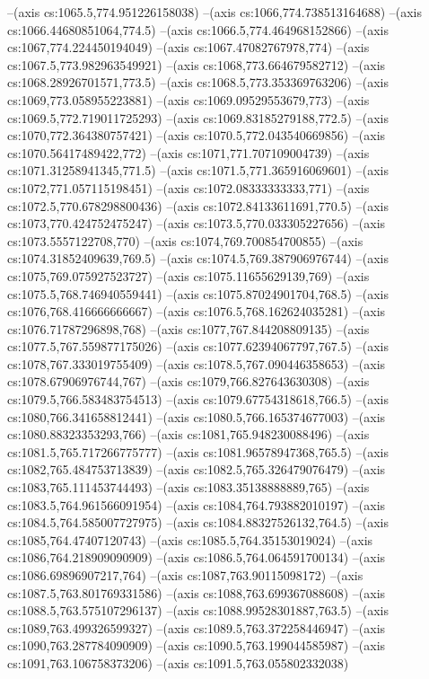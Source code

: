 --(axis cs:1065.5,774.951226158038)
--(axis cs:1066,774.738513164688)
--(axis cs:1066.44680851064,774.5)
--(axis cs:1066.5,774.464968152866)
--(axis cs:1067,774.224450194049)
--(axis cs:1067.47082767978,774)
--(axis cs:1067.5,773.982963549921)
--(axis cs:1068,773.664679582712)
--(axis cs:1068.28926701571,773.5)
--(axis cs:1068.5,773.353369763206)
--(axis cs:1069,773.058955223881)
--(axis cs:1069.09529553679,773)
--(axis cs:1069.5,772.719011725293)
--(axis cs:1069.83185279188,772.5)
--(axis cs:1070,772.364380757421)
--(axis cs:1070.5,772.043540669856)
--(axis cs:1070.56417489422,772)
--(axis cs:1071,771.707109004739)
--(axis cs:1071.31258941345,771.5)
--(axis cs:1071.5,771.365916069601)
--(axis cs:1072,771.057115198451)
--(axis cs:1072.08333333333,771)
--(axis cs:1072.5,770.678298800436)
--(axis cs:1072.84133611691,770.5)
--(axis cs:1073,770.424752475247)
--(axis cs:1073.5,770.033305227656)
--(axis cs:1073.5557122708,770)
--(axis cs:1074,769.700854700855)
--(axis cs:1074.31852409639,769.5)
--(axis cs:1074.5,769.387906976744)
--(axis cs:1075,769.075927523727)
--(axis cs:1075.11655629139,769)
--(axis cs:1075.5,768.746940559441)
--(axis cs:1075.87024901704,768.5)
--(axis cs:1076,768.416666666667)
--(axis cs:1076.5,768.162624035281)
--(axis cs:1076.71787296898,768)
--(axis cs:1077,767.844208809135)
--(axis cs:1077.5,767.559877175026)
--(axis cs:1077.62394067797,767.5)
--(axis cs:1078,767.333019755409)
--(axis cs:1078.5,767.090446358653)
--(axis cs:1078.67906976744,767)
--(axis cs:1079,766.827643630308)
--(axis cs:1079.5,766.583483754513)
--(axis cs:1079.67754318618,766.5)
--(axis cs:1080,766.341658812441)
--(axis cs:1080.5,766.165374677003)
--(axis cs:1080.88323353293,766)
--(axis cs:1081,765.948230088496)
--(axis cs:1081.5,765.717266775777)
--(axis cs:1081.96578947368,765.5)
--(axis cs:1082,765.484753713839)
--(axis cs:1082.5,765.326479076479)
--(axis cs:1083,765.111453744493)
--(axis cs:1083.35138888889,765)
--(axis cs:1083.5,764.961566091954)
--(axis cs:1084,764.793882010197)
--(axis cs:1084.5,764.585007727975)
--(axis cs:1084.88327526132,764.5)
--(axis cs:1085,764.47407120743)
--(axis cs:1085.5,764.35153019024)
--(axis cs:1086,764.218909090909)
--(axis cs:1086.5,764.064591700134)
--(axis cs:1086.69896907217,764)
--(axis cs:1087,763.90115098172)
--(axis cs:1087.5,763.801769331586)
--(axis cs:1088,763.699367088608)
--(axis cs:1088.5,763.575107296137)
--(axis cs:1088.99528301887,763.5)
--(axis cs:1089,763.499326599327)
--(axis cs:1089.5,763.372258446947)
--(axis cs:1090,763.287784090909)
--(axis cs:1090.5,763.199044585987)
--(axis cs:1091,763.106758373206)
--(axis cs:1091.5,763.055802332038)
